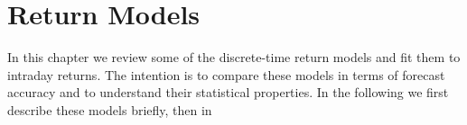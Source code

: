 \chapter{Return Models}\label{chp:PriceModels}
In this chapter we review some of the discrete-time return models and
fit them to intraday returns. The intention is to compare these models
in terms of forecast accuracy and to understand their statistical
properties. In the following we first describe these models briefly,
then in 


